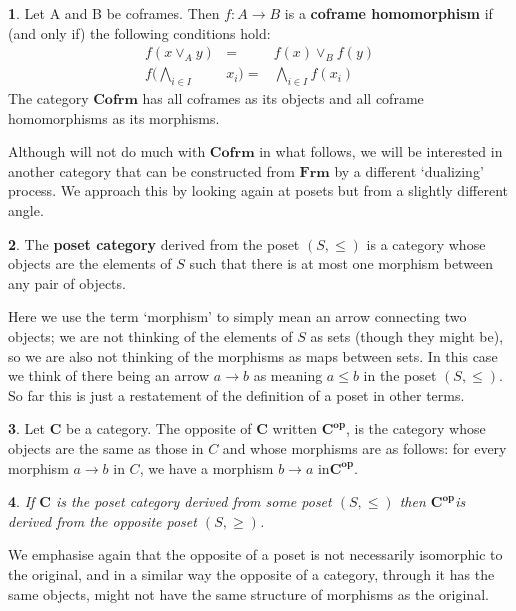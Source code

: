 \documentclass[oneside,english]{amsbook}
\numberwithin{section}{chapter}
\theoremstyle{plain}
\newtheorem{thm}{\protect\theoremname}
\theoremstyle{definition}
\newtheorem{defn}[thm]{\protect\definitionname}
\providecommand{\definitionname}{Definition}
\providecommand{\theoremname}{Theorem}
\begin{document}
\begin{defn} 
	Let A and B be coframes. Then $f:A\to B$ is a \textbf{coframe homomorphism} if (and only if) the following conditions hold:
		\begin{eqnarray*} 
			f(x\lor_{A}y) & = & f(x)\lor_{B}f(y)\\
			f(\bigwedge_{i\in I} & x_{i})= & \bigwedge_{i\in I}f(x_{i}) 
		\end{eqnarray*}
The category \textbf{$\mathbf{Cofrm}$} has all coframes as its objects and all coframe homomorphisms as its morphisms.  
\end{defn} 

Although will not do much with \textbf{$\mathbf{Cofrm}$} in what follows, we will be interested in another category that can be constructed from \textbf{$\mathbf{Frm}$} by a different `dualizing' process. We approach this by looking again at posets but from a slightly different angle. 

\begin{defn} 
	The \textbf{poset category} derived from the poset $(S,\le)$ is a category whose objects are the elements of $S$ such that there is at most one morphism between any pair of objects. 
\end{defn} 

Here we use the term `morphism' to simply mean an arrow connecting two objects; we are not thinking of the elements of $S$ as sets (though they might be), so we are also not thinking of the morphisms as maps between sets. In this case we think of there being an arrow $a\to b$ as meaning $a\le b$ in the poset $(S,\le)$. So far this is just a restatement of the definition of a poset in other terms. 

\begin{defn} 
	Let \textbf{$\mathbf{C}$ }be a category. The opposite of \textbf{$\mathbf{C}$} written $\mathbf{C^{op}}$, is the category whose objects are the same as those in $C$ and whose morphisms are as follows: for every morphism $a\to b$ in $C$, we have a morphism $b\to a$ in$\mathbf{C^{op}}$.
\end{defn} 

\begin{thm} 
	If \textbf{$\mathbf{C}$ }is the poset category derived from some poset $(S,\le)$ then $\mathbf{C^{op}}$is derived from the opposite poset $(S,\ge)$. 
\end{thm} 

We emphasise again that the opposite of a poset is not necessarily isomorphic to the original, and in a similar way the opposite of a category, through it has the same objects, might not have the same structure of morphisms as the original.
\end{document}
